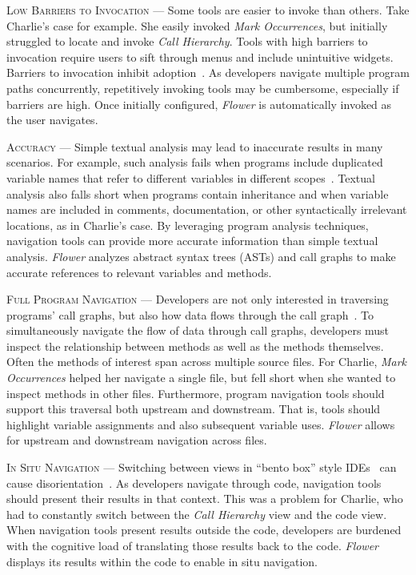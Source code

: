 \documentclass[conference]{IEEEtran}
\begin{document}
\vspace{1em} 
\noindent\textsc{Low Barriers to Invocation} ---
Some tools are easier to invoke than others. 
Take Charlie's case for example.
She easily invoked \emph{Mark Occurrences}, but initially struggled to locate and invoke \emph{Call Hierarchy}.
Tools with high barriers to invocation require users to sift through menus and include unintuitive widgets. 
Barriers to invocation inhibit adoption~\cite{johnson2013don}.
As developers navigate multiple program paths concurrently, repetitively invoking tools may be cumbersome, especially if barriers are high. 
Once initially configured, \textit{Flower} is automatically invoked as the user navigates.

\vspace{1em} 
\noindent\textsc{Accuracy} ---
Simple textual analysis may lead to inaccurate results in many scenarios. For example, such analysis fails when programs include duplicated variable names that refer to different variables in different scopes~\cite{DeLine:2005}. 
Textual analysis also falls short when programs contain inheritance and when variable names are included in comments, documentation, or other syntactically irrelevant locations, as in Charlie's case.
By leveraging program analysis techniques, navigation tools can provide more accurate information than simple textual analysis.
\textit{Flower} analyzes abstract syntax trees (ASTs) and call graphs to make accurate references to relevant variables and methods.

\vspace{1em} 
\noindent\textsc{Full Program Navigation}  ---
Developers are not only interested in traversing programs' call graphs, but also how data flows through the call graph~\cite{Smith2015}.
To simultaneously navigate the flow of data through call graphs, developers must inspect the relationship between methods as well as the methods themselves.
Often the methods of interest span across multiple source files.
For Charlie, \emph{Mark Occurrences} helped her navigate a single file, but fell short when she wanted to inspect methods in other files.
Furthermore, program navigation tools should support this traversal both upstream and downstream. 
That is, tools should highlight variable assignments and also subsequent variable uses. 
\textit{Flower} allows for upstream and downstream navigation across files.

\vspace{1em} 
\noindent\textsc{In Situ Navigation}  ---
Switching between views in ``bento box'' style IDEs~\cite{DeLine:2010:bento} can cause disorientation~\cite{deAlwis2006disorient}.
As developers navigate through code, navigation tools should present their results in that context. 
This was a problem for Charlie, who had to constantly switch between the \emph{Call Hierarchy} view and the code view.
When navigation tools present results outside the code, developers are burdened with the cognitive load of translating those results back to the code.
\textit{Flower} displays its results within the code to enable in situ navigation.
\end{document}
